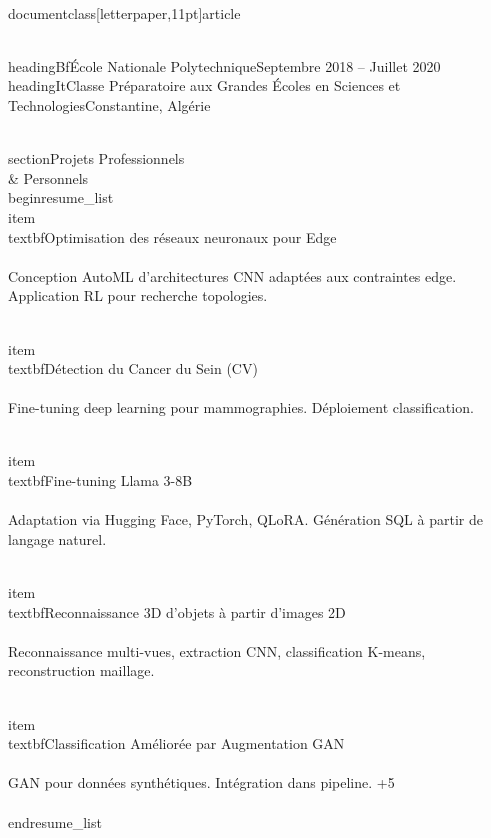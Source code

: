 \\documentclass[letterpaper,11pt]{article}
\begin{document}
\\headingBf{École Nationale Polytechnique}{Septembre 2018 -- Juillet 2020}
\\headingIt{Classe Préparatoire aux Grandes Écoles en Sciences et Technologies}{Constantine, Algérie}

\\section{Projets Professionnels \\& Personnels}
\\begin{resume_list}
  \\item \\textbf{Optimisation des réseaux neuronaux pour Edge} \\\\
  Conception AutoML d'architectures CNN adaptées aux contraintes edge. Application RL pour recherche topologies.
  
  \\item \\textbf{Détection du Cancer du Sein (CV)} \\\\
  Fine-tuning deep learning pour mammographies. Déploiement classification.
  
  \\item \\textbf{Fine-tuning Llama 3-8B} \\\\
  Adaptation via Hugging Face, PyTorch, QLoRA. Génération SQL à partir de langage naturel.
  
  \\item \\textbf{Reconnaissance 3D d'objets à partir d'images 2D} \\\\
  Reconnaissance multi-vues, extraction CNN, classification K-means, reconstruction maillage.
  
  \\item \\textbf{Classification Améliorée par Augmentation GAN} \\\\
  GAN pour données synthétiques. Intégration dans pipeline. +5\\%
\\end{resume_list}
\end{document}
